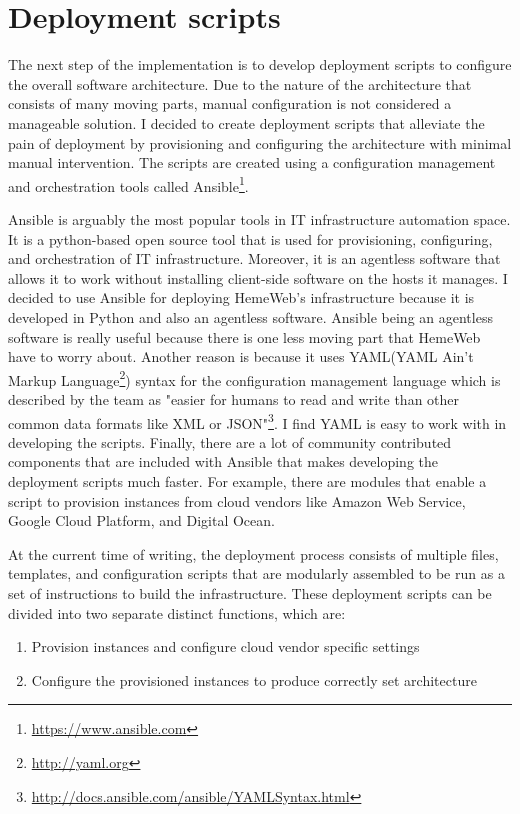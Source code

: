 \section{Deployment scripts}

The next step of the implementation is to develop deployment scripts to configure the overall software architecture. Due to the nature of the architecture that consists of many moving parts, manual configuration is not considered a manageable solution. I decided to create deployment scripts that alleviate the pain of deployment by provisioning and configuring the architecture with minimal manual intervention.  The scripts are created using a configuration management and orchestration tools called Ansible\footnote{\url{https://www.ansible.com}}.

Ansible is arguably the most popular tools in IT infrastructure automation space\citep{mohaan2014learning}. It is a python-based open source tool that is used for provisioning, configuring, and orchestration of IT infrastructure. Moreover, it is an agentless software that allows it to work without installing client-side software on the hosts it manages. I decided to use Ansible for deploying HemeWeb's infrastructure because it is developed in Python and also an agentless software\citep{mohaan2014learning}. Ansible being an agentless software is really useful because there is one less moving part that HemeWeb have to worry about. Another reason is because it uses YAML(YAML Ain't Markup Language\footnote{\url{http://yaml.org}}) syntax for the configuration management language which is described by the team as "easier for humans to read and write than other common data formats like XML or JSON"\footnote{\url{http://docs.ansible.com/ansible/YAMLSyntax.html}}. I find YAML is easy to work with in developing the scripts.  Finally, there are a lot of community contributed components that are included with Ansible that makes developing the deployment scripts much faster. For example, there are modules that enable a script to provision instances from cloud vendors like Amazon Web Service, Google Cloud Platform, and Digital Ocean.  




At the current time of writing, the deployment process consists of multiple files, templates, and configuration scripts that are modularly assembled to be run as a set of instructions to build the infrastructure. These deployment scripts can be divided into two separate distinct functions, which are:

\begin{enumerate}
\item Provision instances and configure cloud vendor specific settings
\item Configure the provisioned instances to produce correctly set architecture
\end{enumerate}

